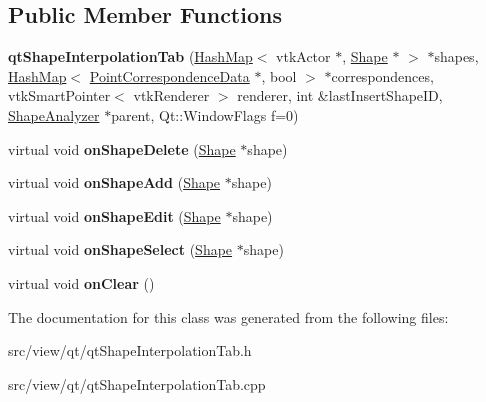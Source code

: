\subsection*{Public Member Functions}
\begin{DoxyCompactItemize}
\item 
\hypertarget{classqt_shape_interpolation_tab_a81e12bc1650f508da0a30903a5ee54d5}{}{\bfseries qt\+Shape\+Interpolation\+Tab} (\hyperlink{class_hash_map}{Hash\+Map}$<$ vtk\+Actor $\ast$, \hyperlink{class_shape}{Shape} $\ast$ $>$ $\ast$shapes, \hyperlink{class_hash_map}{Hash\+Map}$<$ \hyperlink{class_point_correspondence_data}{Point\+Correspondence\+Data} $\ast$, bool $>$ $\ast$correspondences, vtk\+Smart\+Pointer$<$ vtk\+Renderer $>$ renderer, int \&last\+Insert\+Shape\+I\+D, \hyperlink{class_shape_analyzer}{Shape\+Analyzer} $\ast$parent, Qt\+::\+Window\+Flags f=0)\label{classqt_shape_interpolation_tab_a81e12bc1650f508da0a30903a5ee54d5}

\item 
\hypertarget{classqt_shape_interpolation_tab_aac6776b2f521abe2d9aa6f932665cf57}{}virtual void {\bfseries on\+Shape\+Delete} (\hyperlink{class_shape}{Shape} $\ast$shape)\label{classqt_shape_interpolation_tab_aac6776b2f521abe2d9aa6f932665cf57}

\item 
\hypertarget{classqt_shape_interpolation_tab_a9801bcf3d2e1b31a79824d8b623e1762}{}virtual void {\bfseries on\+Shape\+Add} (\hyperlink{class_shape}{Shape} $\ast$shape)\label{classqt_shape_interpolation_tab_a9801bcf3d2e1b31a79824d8b623e1762}

\item 
\hypertarget{classqt_shape_interpolation_tab_a556d7b2a445f0cd5f6a5fd1f912d144a}{}virtual void {\bfseries on\+Shape\+Edit} (\hyperlink{class_shape}{Shape} $\ast$shape)\label{classqt_shape_interpolation_tab_a556d7b2a445f0cd5f6a5fd1f912d144a}

\item 
\hypertarget{classqt_shape_interpolation_tab_a4db77c18d8b2257ac14654ef7c9f5ecd}{}virtual void {\bfseries on\+Shape\+Select} (\hyperlink{class_shape}{Shape} $\ast$shape)\label{classqt_shape_interpolation_tab_a4db77c18d8b2257ac14654ef7c9f5ecd}

\item 
\hypertarget{classqt_shape_interpolation_tab_a71ad9a70adc5408de4ceb94467953d8c}{}virtual void {\bfseries on\+Clear} ()\label{classqt_shape_interpolation_tab_a71ad9a70adc5408de4ceb94467953d8c}

\end{DoxyCompactItemize}


The documentation for this class was generated from the following files\+:\begin{DoxyCompactItemize}
\item 
src/view/qt/qt\+Shape\+Interpolation\+Tab.\+h\item 
src/view/qt/qt\+Shape\+Interpolation\+Tab.\+cpp\end{DoxyCompactItemize}
